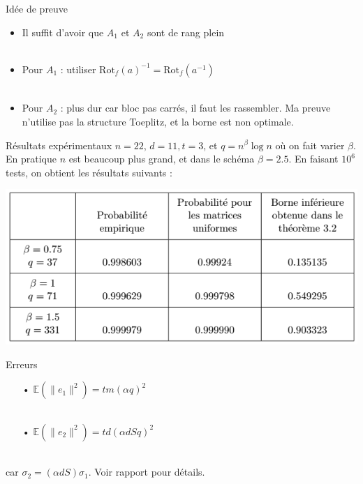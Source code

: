 \documentclass[10 pt, a4paper]{beamer}
\begin{document}
\begin{frame}{Idée de preuve}
\begin{itemize}
\item<1->[•] Il suffit d'avoir que $A_1$ et $A_2$ sont de rang plein\\ ~ \\
\item<2->[•] Pour $A_1$ : utiliser $\text{Rot}_f(a)^{-1}=\text{Rot}_f(a^{-1})$\\ ~ \\
\item<3->[•] Pour $A_2$ : plus dur car bloc pas carrés, il faut les rassembler. Ma preuve n'utilise pas la structure Toeplitz, et la borne est non optimale.
\end{itemize}
\end{frame}


\begin{frame}{Résultats expérimentaux}
$n=22$, $d=11, t=3$, et $q=n^\beta\log{n}$ où on fait varier $\beta$. En pratique $n$ est beaucoup plus grand, et dans le schéma $\beta=2.5$. En faisant $10^6$ tests, on obtient les résultats suivants : \\

\begin{center}
\includegraphics[scale=0.40]{tab_exp.png}
\end{center}
\end{frame}

\begin{frame}{Erreurs}
\begin{itemize}
\item[•] $\mathbb{E}(\|e_1\|^2) = tm(\alpha q)^2 $\\ ~ \\
\item[•] $\mathbb{E}(\|e_2\|^2) = td(\alpha d S q)^2$ \\ ~ \\
\end{itemize}

car $\sigma_2 = (\alpha d S)\sigma_1$. Voir rapport pour détails.
\end{frame}
\end{document}
